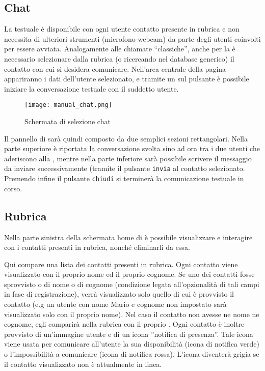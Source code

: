 \subsection{Chat}
La  testuale è disponibile con ogni utente contatto presente in rubrica e non necessita di ulteriori strumenti (microfono-webcam) da parte degli utenti coinvolti per essere avviata. Analogamente alle chiamate ``classiche'', anche per la  è necessario selezionare dalla rubrica (o ricercando nel database generico)  il contatto con cui si desidera comunicare. Nell'area centrale della pagina appariranno i dati dell'utente selezionato, e tramite un  sul pulsante  è possibile iniziare la conversazione testuale con il suddetto utente.\\

\begin{figure}[H]
  \texttt{[image: manual\_chat.png]}
\caption{Schermata di selezione chat}\label{fig:chat}
\end{figure}

Il pannello di  sarà quindi composto da due semplici sezioni rettangolari. Nella parte superiore è riportata la conversazione svolta sino ad ora tra i due utenti che aderiscono alla , mentre nella parte inferiore sarà possibile scrivere il messaggio da inviare successivamente (tramite il pulsante \texttt{invia} al contatto selezionato.\\
Premendo infine il pulsante \texttt{chiudi} si terminerà la comunicazione testuale in corso.


\subsection{Rubrica}
Nella parte sinistra della schermata home di \caName{} è possibile visualizzare e interagire con i contatti presenti in rubrica, nonché eliminarli da essa. 

Qui compare una lista dei contatti presenti in rubrica. Ogni contatto viene visualizzato con il proprio nome ed il proprio cognome. Se uno dei contatti fosse sprovvisto o di nome o di cognome (condizione legata all'opzionalità di tali campi in fase di registrazione), verrà visualizzato solo quello di cui è provvisto il contatto (e.g un utente con nome Mario e cognome non impostato sarà visualizzato solo con il proprio nome). Nel caso il contatto non avesse ne nome ne cognome, egli comparirà nella rubrica con il proprio . Ogni contatto è inoltre provvisto di un'immagine utente e di un icona ''notifica di presenza''. Tale icona viene usata per comunicare all'utente la sua disponibilità (icona di notifica verde) o l'impossibilità a comunicare (icona di notifica rossa). L'icona diventerà grigia se il contatto visualizzato non è attualmente in linea.

